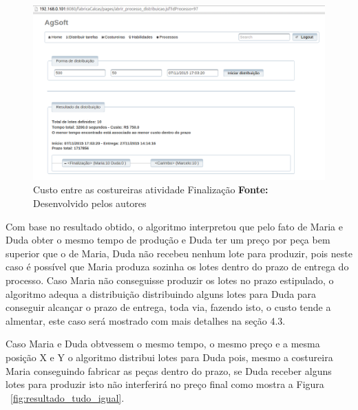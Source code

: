 \begin{figure}[h!]
	\centerline{\includegraphics[scale=0.4]{./imagens/resultado_teste2.png}}
	\caption[Custo entre as costureiras atividade Finalização]
	{Custo entre as costureiras atividade Finalização \textbf{Fonte:} Desenvolvido pelos autores}
	\label{fig:resultado_custo}
\end{figure}

\par Com base no resultado obtido, o algoritmo interpretou que pelo fato de
Maria e Duda obter o mesmo tempo de produção e Duda ter um preço por peça
bem superior que o de Maria, Duda não recebeu nenhum lote para produzir, pois neste
caso é possível que Maria produza sozinha os lotes dentro do prazo de entrega do
processo. Caso Maria não conseguisse produzir os lotes no prazo estipulado, o
algoritmo adequa a distribuição distribuindo alguns lotes para Duda para
conseguir alcançar o prazo de entrega, toda via, fazendo isto, o custo tende a
almentar, este caso será mostrado com mais detalhes na seção 4.3.

\par Caso Maria e Duda obtvessem o mesmo tempo, o mesmo preço e a mesma posição
X e Y o algoritmo distribui lotes para Duda pois, mesmo a costureira Maria
conseguindo fabricar as peças dentro do prazo, se Duda receber alguns lotes para produzir
isto não interferirá no preço final como mostra a Figura
~\ref{fig:resultado_tudo_igual}.
\newpage

